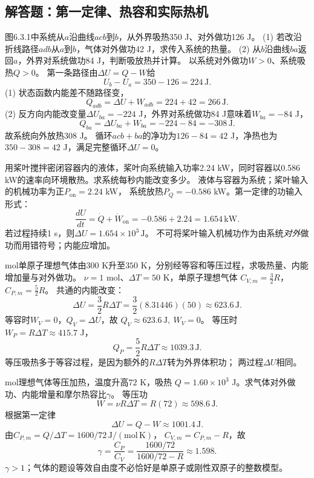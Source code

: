 \subsection{解答题：第一定律、热容和实际热机}

\problemtext 图6.3.1中系统从$a$沿曲线$acb$到$b$，从外界吸热350 J、对外做功126 J。
(1) 若改沿折线路径$adb$从$a$到$b$，气体对外做功42 J，求传入系统的热量。
(2) 从$b$沿曲线$ba$返回$a$，外界对系统做功84 J，判断吸放热并计算。
\workings
以系统对外做功$W>0$、系统吸热$Q>0$。
第一条路径由$\Delta U=Q-W$给
\[
U_b-U_a=350-126=\boxed{224\,\mathrm J}.
\]
(1) 状态函数内能差不随路径变，
\[
\boxed{Q_{adb}=\Delta U+W_{adb}=224+42=266\,\mathrm J}.
\]
(2) 反方向内能改变量$\Delta U_{ba}=-224$ J，外界对系统做功84 J意味着$W_{ba}=-84$ J，
\[
\boxed{Q_{ba}=\Delta U_{ba}+W_{ba}
=-224-84=-308\,\mathrm J}.
\]
故系统向外放热308 J。
\crosscheck 循环$acb+ba$的净功为$126-84=42$ J，净热也为$350-308=42$ J，满足完整循环$\Delta U=0$。

\problemtext 用桨叶搅拌密闭容器内的液体，桨叶向系统输入功率2.24 kW，同时容器以0.586 kW的速率向环境散热。求系统每秒内能改变多少。
\workings
液体与容器为系统；桨叶输入的机械功率为正$P_{\mathrm{on}}=2.24$ kW，
系统放热$P_Q=-0.586$ kW。第一定律的功输入形式：
\[
\frac{dU}{dt}=\dot Q+\dot W_{\mathrm{on}}
=-0.586+2.24
=\boxed{1.654\,\mathrm{kW}}.
\]
若过程持续1 s，则$\boxed{\Delta U=1.654\times10^3\,\mathrm J}$。
\crosscheck 不可将桨叶输入机械功作为由系统\emph{对外}做功而用错符号；内能应增加。

 mol单原子理想气体由$300$ K升至$350$ K，分别经等容和等压过程，求吸热量、内能增加量与对外做功。
\workings
$\nu=1$ mol、$\Delta T=50$ K，单原子理想气体
$C_{V,m}=\frac32R$，$C_{P,m}=\frac52R$。
共通的内能改变：
\[
\boxed{\Delta U=\frac32R\Delta T
=\frac32(8.31446)(50)\approx623.6\,\mathrm J}.
\]
等容时$W_V=0$，$Q_V=\Delta U$，故
$\boxed{Q_V\approx623.6\,\mathrm J,\ W_V=0}$。
等压时$W_P=R\Delta T\approx415.7$ J，
\[
\boxed{Q_P=\frac52R\Delta T\approx1039.3\,\mathrm J}.
\]
\crosscheck 等压吸热多于等容过程，是因为额外的$R\Delta T$转为外界体积功；
两过程$\Delta U$相同。

 mol理想气体等压加热，温度升高$72$ K，吸热
$Q=1.60\times10^3$ J。求气体对外做功、内能增量和摩尔热容比$\gamma$。
\workings
等压功
\[
\boxed{W=\nu R\Delta T=R(72)\approx598.6\,\mathrm J}.
\]
根据第一定律
\[
\boxed{\Delta U=Q-W\approx1001.4\,\mathrm J}.
\]
由$C_{P,m}=Q/\Delta T=1600/72\,\mathrm{J/(mol\,K)}$，
$C_{V,m}=C_{P,m}-R$，故
\[
\boxed{\gamma=\frac{C_P}{C_V}
=\frac{1600/72}{1600/72-R}
\approx1.598}.
\]
\crosscheck $\gamma>1$；气体的题设等效自由度不必恰好是单原子或刚性双原子的整数模型。

